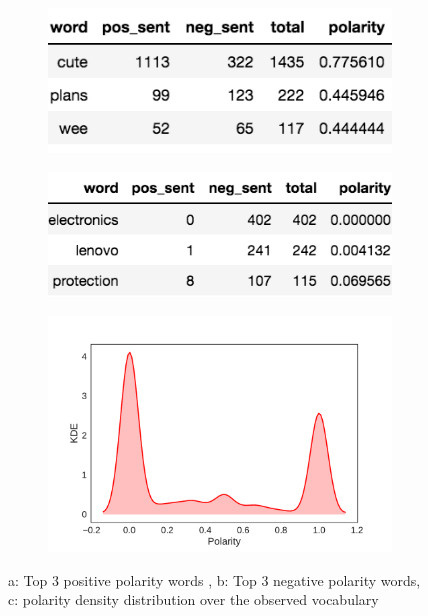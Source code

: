 \documentclass[10pt,conference,compsocconf,retainorgcmds]{IEEEtran}
\begin{document}
\begin{figure}[h]
    \centering
    \begin{subfigure}[b]{0.25\textwidth}
        \includegraphics[scale=0.5]{imag/pos.png}
        \caption{}
        \label{pos}
    \end{subfigure}%
    \begin{subfigure}[b]{0.25\textwidth}
        \includegraphics[scale=0.54]{imag/neg.png}
        \caption{}
        \label{neg}
    \end{subfigure}
    \begin{subfigure}[b]{0.5\textwidth}
        \includegraphics[scale=0.4]{imag/kde_polarity.pdf}
        \caption{}
        \label{polarity1}
    \end{subfigure}
    \caption{a: Top 3 positive polarity words , b: Top 3 negative polarity words, c: polarity density distribution over the observed vocabulary}
    \label{polarity}
\end{figure}
\end{document}
